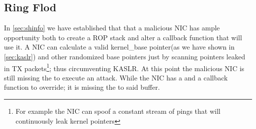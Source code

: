 \subsection{Ring Flod}
In \ref{sec:shinfo} we have established that that a malicious NIC has ample opportunity both to create a ROP stack and alter a callback function that will use it. A NIC can calculate a valid kernel\_base pointer(as we have shown in \ref{sec:kaslr}) and other randomized base pointers just by scanning pointers leaked in TX packets\footnote{For example the NIC can spoof a constant stream of pings that will continuously leak kernel pointers}; thus circumventing KASLR. At this point the malicious NIC is still missing the \means to execute an attack.
While the NIC has a \mabaf and a callback function to override; it is missing the \kva to said buffer.

\newline
